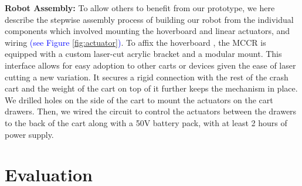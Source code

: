 \begin{comment}
\begin{figure}[t] 
\centering 
\texttt{[image: figures/Actuator\_v3.png]} 
\caption{We built two linear actuator casing prototypes. The case for the first prototype pushed the actuator back when it opened so we built a more stable casing to hold it in place.} 
\label{fig:actuator}
\end{figure}


 \begin{figure}[t] 
	\centering 
	\texttt{[image: figures/assembly\_v1.png]} 
	\caption{Prototype 2 assembly of hardware components.} 
	\label{fig:assembly} 
\end{figure}
\end{comment}

\textbf{Robot Assembly:} To allow others to benefit from our prototype, we here describe the stepwise assembly process of building our robot from the individual components which involved mounting the hoverboard and linear actuators, and wiring \textcolor{blue}{(see Figure \ref{fig:actuator})}. 
To affix the hoverboard \cite{mandel2023recapturing}, the MCCR is equipped with a custom laser-cut acrylic bracket and a modular mount. 
This interface allows for easy adoption to other carts or devices given the ease of laser cutting a new variation. 
It secures a rigid connection with the rest of the crash cart and the weight of the cart on top of it further keeps the mechanism in place.
We drilled holes on the side of the cart to mount the actuators on the cart drawers. 
Then, we wired the circuit to control the actuators between the drawers to the back of the cart along with a 50V battery pack, with at least 2 hours of power supply.


 






\section{Evaluation}

